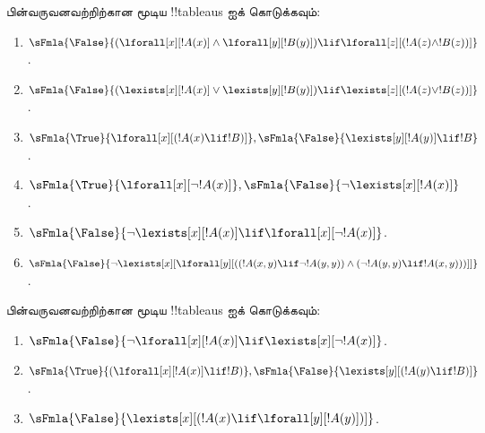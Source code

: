 \documentclass[../../../include/open-logic-section]{subfiles}
\begin{document}
\begin{prob}
பின்வருவனவற்றிற்கான மூடிய !!{tableau}s ஐக் கொடுக்கவும்:
\begin{enumerate}
\item $\sFmla{\False}{(\lforall[x][!A(x)] \land \lforall[y][!B(y)])
\lif \lforall[z][(!A(z) \land !B(z))]}$.
\item $\sFmla{\False}{(\lexists[x][!A(x)] \lor \lexists[y][!B(y)])
\lif \lexists[z][(!A(z) \lor !B(z))]}$.
\item $\sFmla{\True}{\lforall[x][(!A(x) \lif !B)]},
\sFmla{\False}{\lexists[y][!A(y)] \lif !B}$.
\item $\sFmla{\True}{\lforall[x][\lnot !A(x)]},
\sFmla{\False}{\lnot\lexists[x][!A(x)]}$.
\item $\sFmla{\False}{\lnot\lexists[x][!A(x)] \lif \lforall[x][\lnot
!A(x)]}$.
\item $\sFmla{\False}{\lnot\lexists[x][\lforall[y][((!A(x,y) \lif
\lnot !A(y,y)) \land (\lnot !A(y,y) \lif !A(x,y)))]]}$.
\end{enumerate}
\end{prob}

\begin{prob}
பின்வருவனவற்றிற்கான மூடிய !!{tableau}s ஐக் கொடுக்கவும்:
\begin{enumerate}
\item $\sFmla{\False}{\lnot\lforall[x][!A(x)] \lif \lexists[x][\lnot!A(x)]}$.
\item $\sFmla{\True}{(\lforall[x][!A(x)] \lif !B)}, \sFmla{\False}{\lexists[y][(!A(y) \lif !B)]}$.
\item $\sFmla{\False}{\lexists[x][(!A(x) \lif \lforall[y][!A(y)])]}$.
\end{enumerate}
\end{prob}
\end{document}
